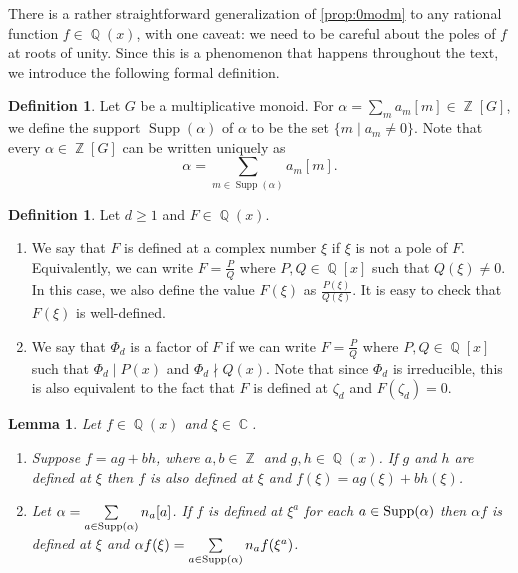 \documentclass[12t,a4paper]{amsart}
\newtheorem{lem}[thm]{Lemma}
\theoremstyle{definition}
\newtheorem{definition}[thm]{Definition}
\newtheorem{rem}[thm]{Remark}
\DeclareMathOperator{\C}{\mathbb{C}}
\DeclareMathOperator{\Z}{\mathbb{Z}}
\DeclareMathOperator{\N}{\mathbb{N}}
\DeclareMathOperator{\Q}{\mathbb{Q}}
\DeclareMathOperator{\supp}{{\rm Supp}}
\DeclareMathOperator{\Supp}{\text{Supp}}
\numberwithin{equation}{section}
\begin{document}
{

There is a rather straightforward generalization of \cref{prop:0modm} to any rational function $f \in \Q(x)$, with one caveat: we need to be careful about the poles of $f$ at roots of unity. Since this is a phenomenon that happens throughout the text, we introduce the following formal definition.
 


\begin{definition}
 Let $G$ be a multiplicative monoid.   For $\alpha  = \sum_{m} a_m [m] \in \Z[G]$, we define the support $\Supp(\alpha)$ of $\alpha$ to be the set $\{m \mid a_m \neq 0 \}.$ Note that every $\alpha \in \Z[G] $ can be written uniquely as 
\[ \alpha = \sum_{m \in \Supp(\alpha)} a_m [m]. \] 

\end{definition}

\begin{definition} \label{def defined}
   Let $d \geq 1$ and $F \in \Q(x).$
   \begin{enumerate}
       \item 
  We say that $F$ is defined at a complex number $\xi$ if $\xi$ is not a pole of $F.$ Equivalently, we can write $F=\frac{P}{Q}$ where $P, Q \in \Q[x]$ such that $Q(\xi) \neq 0.$ 
  In this case, we also define the value $F(\xi)$ as $
  \frac{P(\xi)}{Q(\xi)}$. It is easy to check that $F(\xi)$ is well-defined.
  
  \item We say that $\Phi_d$ is a factor of $F$ if  we can write $F=\frac{P}{Q}$ where $P, Q \in \Q[x]$ such that $\Phi_d\mid P(x)$ and $\Phi_d \nmid Q(x)$. Note that since $\Phi_d$ is irreducible, this is also equivalent to the fact that $F$ is defined at $\zeta_d$ and $F(\zeta_d)=0$. 
   \end{enumerate}
\end{definition}






\begin{lem} Let $f\in \Q(x)$ and $\xi\in \C$.
\begin{enumerate}
\item Suppose $f=ag+bh$, where $a,b\in \Z$ and $g,h\in \Q(x)$. If $g$ and $h$ are defined at $\xi$ then $f$ is also defined at $\xi$ and $f(\xi)=ag(\xi)+bh(\xi)$. 
\item Let $\alpha=\sum\limits_{a\in \supp(\alpha)} n_a[a]$. If $f$ is defined at $\xi^a$ for each $a\in\supp(\alpha)$ then $\alpha f$ is defined at $\xi$ and $\alpha f(\xi) =\sum\limits_{a\in \supp(\alpha)} n_a f(\xi^a)$.
\end{enumerate}


\end{lem}}
\end{document}
